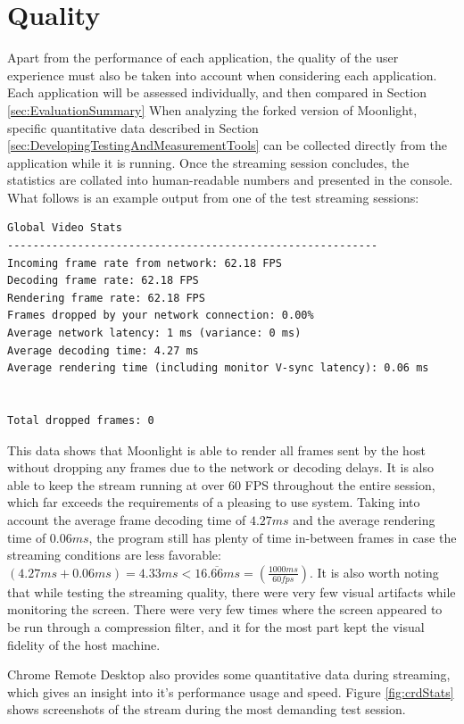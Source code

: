 \section{Quality}\label{sec:Quality}

Apart from the performance of each application, the quality of the user experience must also be taken into account when considering each application.
Each application will be assessed individually, and then compared in Section \ref{sec:EvaluationSummary}
When analyzing the forked version of Moonlight, specific quantitative data described in Section \ref{sec:DevelopingTestingAndMeasurementTools} can be collected directly from the application while it is running.
Once the streaming session concludes, the statistics are collated into human-readable numbers and presented in the console.
What follows is an example output from one of the test streaming sessions:

\begin{lstlisting}[style=plaintext,title=Statistics generated after a streaming session]
Global Video Stats
----------------------------------------------------------
Incoming frame rate from network: 62.18 FPS
Decoding frame rate: 62.18 FPS
Rendering frame rate: 62.18 FPS
Frames dropped by your network connection: 0.00%
Average network latency: 1 ms (variance: 0 ms)
Average decoding time: 4.27 ms
Average rendering time (including monitor V-sync latency): 0.06 ms


Total dropped frames: 0
\end{lstlisting}

This data shows that Moonlight is able to render all frames sent by the host without dropping any frames due to the network or decoding delays.
It is also able to keep the stream running at over 60 FPS throughout the entire session, which far exceeds the requirements of a pleasing to use system.
Taking into account the average frame decoding time of $4.27ms$ and the average rendering time of $0.06ms$, the program still has plenty of time in-between frames in case the streaming conditions are less favorable:
$(4.27ms+0.06ms) = 4.33ms < 16.\overline{66}ms = (\frac{1000ms}{60fps})$.
It is also worth noting that while testing the streaming quality, there were very few visual artifacts while monitoring the screen.
There were very few times where the screen appeared to be run through a compression filter, and it for the most part kept the visual fidelity of the host machine.

Chrome Remote Desktop also provides some quantitative data during streaming, which gives an insight into it's performance usage and speed. Figure \ref{fig:crdStats} shows screenshots of the stream during the most demanding test session.

